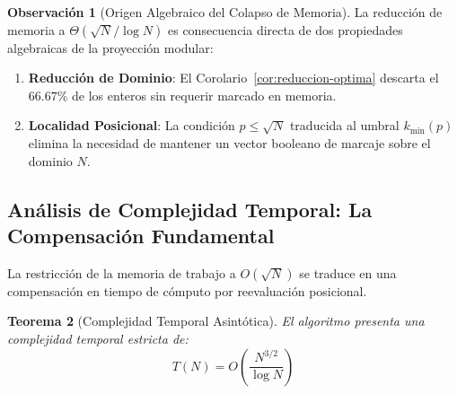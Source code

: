 \documentclass{article}
\numberwithin{equation}{section}
\theoremstyle{plain}
\newtheorem{theorem}{Teorema}[section]
\theoremstyle{definition}
\newtheorem{remark}[theorem]{Observación}
\begin{document}
\begin{remark}[Origen Algebraico del Colapso de Memoria]
La reducción de memoria a $\Theta(\sqrt{N}/\log N)$ es consecuencia directa de dos propiedades algebraicas de la proyección modular:
\begin{enumerate}
    \item \textbf{Reducción de Dominio}: El Corolario~\ref{cor:reduccion-optima} descarta el $66.67\%$ de los enteros sin requerir marcado en memoria.
    \item \textbf{Localidad Posicional}: La condición $p \le \sqrt{N}$ traducida al umbral $k_{\min}(p)$ elimina la necesidad de mantener un vector booleano de marcaje sobre el dominio $N$.
\end{enumerate}
\end{remark}

\subsection{Análisis de Complejidad Temporal: La Compensación Fundamental}

La restricción de la memoria de trabajo a $O(\sqrt{N})$ se traduce en una compensación en tiempo de cómputo por reevaluación posicional.

\begin{theorem}[Complejidad Temporal Asintótica]
\label{thm:complejidad-temporal}
El algoritmo presenta una complejidad temporal estricta de:
\begin{equation}
T(N) = O\left(\frac{N^{3/2}}{\log N}\right)
\end{equation}
\end{theorem}
\end{document}
